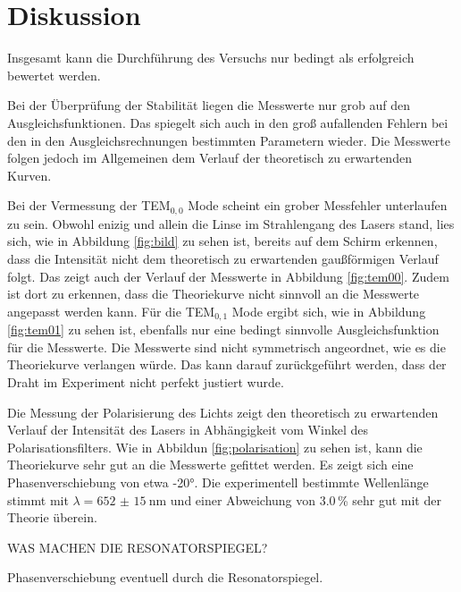 \section{Diskussion}
\label{sec:Diskussion}
Insgesamt kann die Durchführung des Versuchs nur bedingt als erfolgreich
bewertet werden.

Bei der Überprüfung der Stabilität liegen die Messwerte nur grob auf den
Ausgleichsfunktionen. Das spiegelt sich auch in den groß aufallenden Fehlern bei
den in den Ausgleichsrechnungen bestimmten Parametern wieder. Die Messwerte folgen
jedoch im Allgemeinen dem Verlauf der theoretisch zu erwartenden Kurven.

Bei der Vermessung der TEM$_{\mathrm{0,0}}$ Mode scheint ein grober Messfehler
unterlaufen zu sein. Obwohl enizig und allein die Linse im Strahlengang des Lasers
stand, lies sich, wie in Abbildung \ref{fig:bild} zu sehen ist, bereits auf dem
Schirm erkennen, dass die Intensität nicht dem theoretisch zu erwartenden gaußförmigen
Verlauf folgt. Das zeigt auch der Verlauf der Messwerte in Abbildung \ref{fig:tem00}.
Zudem ist dort zu erkennen, dass die Theoriekurve nicht sinnvoll an die Messwerte
angepasst werden kann.
Für die TEM$_{\mathrm{0,1}}$ Mode ergibt sich, wie in Abbildung \ref{fig:tem01} zu
sehen ist, ebenfalls nur eine bedingt sinnvolle Ausgleichsfunktion für die Messwerte.
Die Messwerte sind nicht symmetrisch angeordnet, wie es die Theoriekurve verlangen würde.
Das kann darauf zurückgeführt werden, dass der Draht im Experiment nicht perfekt
justiert wurde.

Die Messung der Polarisierung des Lichts zeigt den theoretisch zu erwartenden Verlauf
der Intensität des Lasers in Abhängigkeit vom Winkel des Polarisationsfilters. Wie
in Abbildun \ref{fig:polarisation} zu sehen ist, kann die Theoriekurve sehr gut an
die Messwerte gefittet werden. Es zeigt sich eine Phasenverschiebung von etwa -20°.
Die experimentell bestimmte Wellenlänge stimmt mit $\lambda=\SI{652(15)}{\nano\metre}$
und einer Abweichung von 3.0\,\% sehr gut mit der Theorie überein.

WAS MACHEN DIE RESONATORSPIEGEL?

Phasenverschiebung eventuell durch die Resonatorspiegel.
